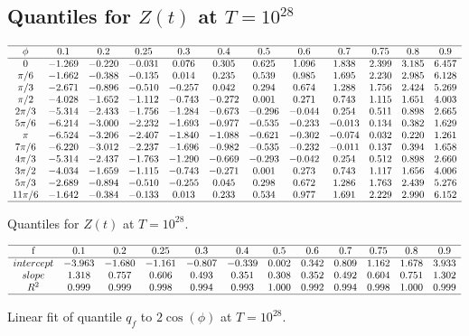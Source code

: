 \documentclass[twoside]{article}
\begin{document}
\subsection{\label{E28}Quantiles for $Z(t)$ at $T=10^{28}$}

\begin{table}
\centering \(\begin{array}{cccccccccccc}
\hline
\phi&0.1&0.2&0.25&0.3&0.4&0.5&0.6&0.7&0.75&0.8&0.9 \\
\hline
0&-1.269&-0.220&-0.031&0.076&0.305&0.625&1.096&1.838&2.399&3.185&6.457\\
\pi/6 &-1.662&-0.388&-0.135&0.014&0.235&0.539&0.985&1.695&2.230&2.985&6.128\\
\pi/3 &-2.671&-0.896&-0.510&-0.257&0.042&0.294&0.674&1.288&1.756&2.424&5.269\\
\pi/2 &-4.028&-1.652&-1.112&-0.743&-0.272&0.001&0.271&0.743&1.115&1.651&4.003\\
2\pi/3 &-5.314&-2.433&-1.756&-1.284&-0.673&-0.296&-0.044&0.254&0.511&0.898&2.665\\
5\pi/6 &-6.214&-3.000&-2.232&-1.693&-0.977&-0.535&-0.233&-0.013&0.134&0.382&1.629\\
\pi &-6.524&-3.206&-2.407&-1.840&-1.088&-0.621&-0.302&-0.074&0.032&0.220&1.261\\
7\pi/6 &-6.220&-3.012&-2.237&-1.696&-0.982&-0.535&-0.232&-0.011&0.137&0.394&1.658\\
4\pi/3 &-5.314&-2.437&-1.763&-1.290&-0.669&-0.293&-0.042&0.254&0.512&0.898&2.660\\
3\pi/2 &-4.034&-1.659&-1.115&-0.743&-0.271&0.001&0.273&0.743&1.117&1.656&4.006\\
5\pi/3 &-2.689&-0.894&-0.510&-0.255&0.045&0.298&0.672&1.286&1.763&2.439&5.276\\
11\pi/6 &-1.642&-0.384&-0.133&0.013&0.233&0.534&0.977&1.691&2.229&2.990&6.152\\
\hline
\end{array}\)
\caption{Quantiles  for  $Z(t)$ at $T=10^{28}$.}
\label{tab:quantiles28}
\end{table}

\begin{table}
\centering \(\begin{array}{cccccccccccc}
\hline
$f$&0.1&0.2&0.25&0.3&0.4&0.5&0.6&0.7&0.75&0.8&0.9\\
\hline
intercept&-3.963&-1.680&-1.161&-0.807&-0.339&0.002&0.342&0.809&1.162&1.678&3.933\\
slope&1.318&0.757&0.606&0.493&0.351&0.308&0.352&0.492&0.604&0.751&1.302\\
R^2&0.999&0.999&0.998&0.994&0.993&1.000&0.992&0.994&0.998&1.000&0.999\\
\hline
\end{array}\)
\caption{Linear fit of quantile $q_f$ to $2\cos(\phi)$ at $T=10^{28}$.}
\label{tab:fit28}
\end{table}
\end{document}
